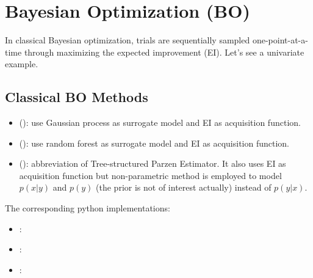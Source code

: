 \documentclass[letterpaper,10pt,english]{sphinxmanual}
\begin{document}
\section{Bayesian Optimization (BO)}
\label{\detokenize{pybayopt:bayesian-optimization-bo}}\label{\detokenize{pybayopt::doc}}
In classical Bayesian optimization, trials are sequentially sampled one-point-at-a-time through
maximizing the expected improvement (EI). Let’s see a univariate example.



\subsection{Classical BO Methods}
\label{\detokenize{pybayopt:classical-bo-methods}}\begin{itemize}
\item {} 
 (): use Gaussian process as surrogate model and EI as acquisition function.

\item {} 
 (): use random forest as surrogate model and EI as acquisition function.

\item {} 
 (): abbreviation of Tree-structured Parzen Estimator. It also uses EI as acquisition function but non-parametric method is employed to model \(p(x|y)\) and \(p(y)\) (the prior is not of interest actually) instead of \(p(y|x)\).

\end{itemize}

The corresponding python implementations:
\begin{itemize}
\item {} 
: 

\item {} 
: 

\item {} 
: 

\end{itemize}
\end{document}
